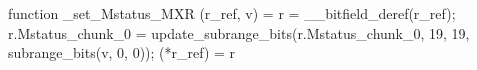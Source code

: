 function _set_Mstatus_MXR (r_ref, v) = {
    r = __bitfield_deref(r_ref);
    r.Mstatus_chunk_0 = update_subrange_bits(r.Mstatus_chunk_0, 19, 19, subrange_bits(v, 0, 0));
    (*r_ref) = r
}
